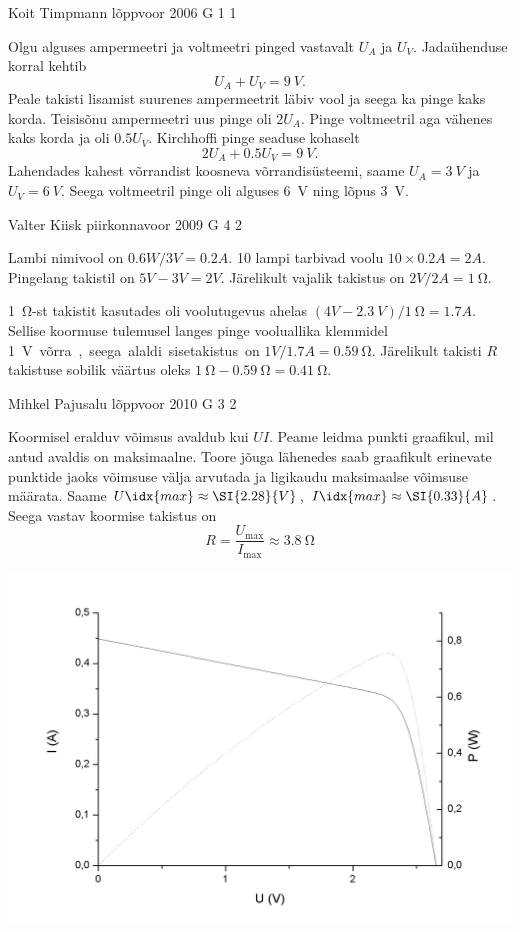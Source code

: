 \documentclass[11pt, twoside]{article}
\begin{document}
{%
{Koit Timpmann} %
{lõppvoor} %
{2006} %
{G 1} %
{1} %
{

\ifSolution
Olgu alguses ampermeetri ja voltmeetri pinged vastavalt $U_A$ ja $U_V$. Jadaühenduse korral kehtib
\[
U_A + U_V = \SI{9}{V}.
\]
Peale takisti lisamist suurenes ampermeetrit läbiv vool ja seega ka pinge kaks korda. Teisisõnu ampermeetri uus pinge oli $2U_A$. Pinge voltmeetril aga vähenes kaks korda ja oli $\num{0,5}U_V$. Kirchhoffi pinge seaduse kohaselt
\[
2U_A + \num{0,5}U_V = \SI{9}{V}.
\]
Lahendades kahest võrrandist koosneva võrrandisüsteemi, saame $U_A = \SI{3}{V}$ ja $U_V = \SI{6}{V}$. Seega voltmeetril pinge oli alguses \SI{6}{V} ning lõpus \SI{3}{V}.
\fi
}

{Valter Kiisk} %
{piirkonnavoor} %
{2009} %
{G 4} %
{2} %
{

\ifSolution
\osa Lambi nimivool on $\SI{0,6}W/\SI{3}V=\SI{0,2}A$. 10
lampi tarbivad voolu $10\times \SI{0,2}A=\SI{2}A$. Pingelang takistil on $\SI{5}V-\SI{3}V=\SI{2}V$. Järelikult vajalik takistus on $\SI{2}V/\SI{2}A=\SI{1}{\ohm}$.

\osa \SI{1}{\ohm}-st takistit kasutades oli voolutugevus ahelas $(\SI{4}V-\SI{2,3}{V})/\SI{1}{\ohm}=\SI{1,7}A$. Sellise koormuse tulemusel langes pinge vooluallika
klemmidel \SI{1}V võrra, seega alaldi sisetakistus on $\SI{1}V/\SI{1,7}A=\SI{0,59}{\ohm}$. Järelikult takisti $R$ takistuse sobilik väärtus oleks
$\SI{1}{\ohm}-\SI{0,59}{\ohm}=\SI{0,41}{\ohm}$.
\fi
}

{Mihkel Pajusalu} %
{lõppvoor} %
{2010} %
{G 3} %
{2} %
{

\ifSolution
Koormisel eralduv võimsus avaldub kui $UI$. Peame leidma punkti graafikul, mil antud avaldis on maksimaalne. Toore jõuga lähenedes saab graafikult erinevate punktide jaoks võimsuse välja arvutada ja ligikaudu maksimaalse võimsuse määrata. Saame $U\idx{max} \approx \SI{2.28}{V}$, $I\idx{max}\approx \SI{0.33}{A}$. Seega vastav koormise takistus on
\[
R = \frac{U_\mathrm{max}}{I_\mathrm{max}} \approx \SI{3.8}{\ohm}
\]


\begin{center}
	\vspace{-0.1cm}
	\includegraphics[width=0.8\linewidth]{2010-v3g-03-paneel_lah.png}
\end{center}

}}
\end{document}
